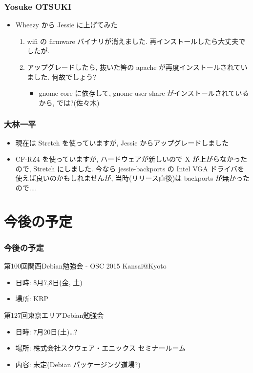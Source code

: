\documentclass[cjk,dvipdfmx,10pt,compress,%
hyperref={bookmarks=true,bookmarksnumbered=true,bookmarksopen=false,%
  colorlinks=false,%
  pdftitle={第 99 回 関西 Debian 勉強会},%
  pdfauthor={倉敷・のがた・佐々木・かわだ},%
  pdfsubject={資料},%
}]{beamer}
\begin{document}
\begin{frame}
\frametitle{Yosuke OTSUKI}
\begin{itemize}
\item %
  Wheezy から Jessie に上げてみた
  \begin{enumerate}
  \item %
    wifi の firmware バイナリが消えました. 再インストールしたら大丈夫でしたが.
  \item %
    アップグレードしたら, 抜いた筈の apache が再度インストールされていました. 何故でしょう?
    \begin{itemize}
    \item %
      gnome-core に依存して, gnome-user-share がインストールされているから, では?(佐々木)
    \end{itemize}
  \end{enumerate}
\end{itemize}
\end{frame}
\begin{frame}
\frametitle{大林一平}
\begin{itemize}
\item %
  現在は Stretch を使っていますが, Jessie からアップグレードしました
\item %
  CF-RZ4 を使っていますが, ハードウェアが新しいので X が上がらなかったので, Stretch にしました.
  今なら jessie-backports の Intel VGA ドライバを使えば良いのかもしれませんが, 当時(リリース直後)は backports が無かったので....
\end{itemize}
\end{frame}



\section{今後の予定}
\begin{frame}[fragile]
\frametitle{今後の予定}

\begin{block}{第100回関西Debian勉強会 - OSC 2015 Kansai@Kyoto}
  \begin{itemize}
  \item 日時: 8月7,8日(金, 土)
  \item 場所: KRP
  \end{itemize}
\end{block}

\begin{block}{第127回東京エリアDebian勉強会}
  \begin{itemize}
  \item 日時: 7月20日(土)…?
  \item 場所: 株式会社スクウェア・エニックス セミナールーム
  \item 内容: 未定(Debian パッケージング道場?)
  \end{itemize}
\end{block}

\end{frame}

\takahashi[50]{  }
\end{document}
